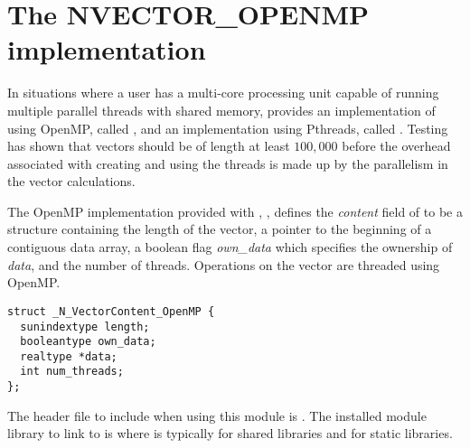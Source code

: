 \section{The NVECTOR\_OPENMP implementation}\label{ss:nvec_openmp}

In situations where a user has a multi-core processing unit capable of
running multiple parallel threads with shared memory, {\sundials} provides
an implementation of {\nvector} using OpenMP, called {\nvecopenmp}, and
an implementation using Pthreads, called {\nvecpthreads}.  
Testing has shown that vectors should be of length at least $100,000$ 
before the overhead associated with creating and using the threads is
made up by the parallelism in the vector calculations. 

The OpenMP {\nvector} implementation provided with {\sundials},
{\nvecopenmp}, defines the {\em content} field of  to be a structure 
containing the length of the vector, a pointer to the beginning of a contiguous 
data array, a boolean flag {\em own\_data} which specifies the ownership 
of {\em data}, and the number of threads.  
Operations on the vector are threaded using OpenMP.
\begin{verbatim} 
struct _N_VectorContent_OpenMP {
  sunindextype length;
  booleantype own_data;
  realtype *data;
  int num_threads;
};
\end{verbatim}

The header file to include when using this module is .
The installed module library to link to is
where  is typically  for shared libraries and 
for static libraries.

